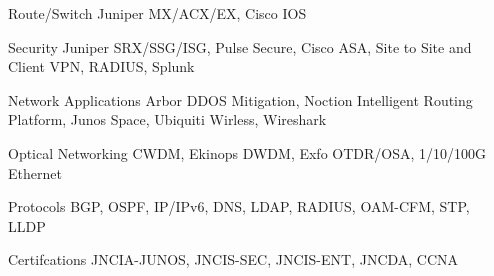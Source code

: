 


\begin{cvskills}


\cvskill
{Route/Switch}
{Juniper MX/ACX/EX, Cisco IOS}


\cvskill
{Security}
{Juniper SRX/SSG/ISG, Pulse Secure, Cisco ASA, Site to Site and Client VPN, RADIUS, Splunk}


\cvskill
{Network Applications}
{Arbor DDOS Mitigation, Noction Intelligent Routing Platform, Junos Space, Ubiquiti Wirless, Wireshark}


\cvskill
{Optical Networking}
{CWDM, Ekinops DWDM, Exfo OTDR/OSA, 1/10/100G Ethernet}


\cvskill
{Protocols}
{BGP, OSPF, IP/IPv6, DNS, LDAP, RADIUS, OAM-CFM, STP, LLDP}


\cvskill
{Certifcations}
{JNCIA-JUNOS, JNCIS-SEC, JNCIS-ENT, JNCDA, CCNA}

\end{cvskills}
